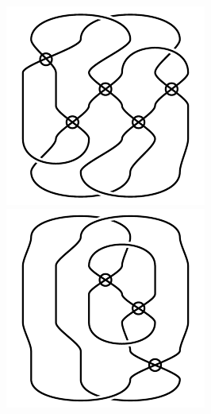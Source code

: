 \begin{figure}[H]
\begin{minipage}[b]{.18\linewidth}
\centering
\includegraphics[width=\linewidth]{../data/virtual_4_72.png}
\end{minipage}
\begin{minipage}[b]{.18\linewidth}
\centering
\includegraphics[width=\linewidth]{../data/virtual_4_73.png}

\end{minipage}
\end{figure}
